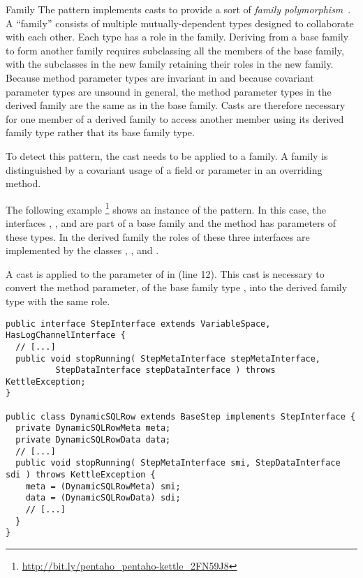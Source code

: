 \begin{pattern}{Family}
  The \thisp{} pattern implements casts
  to provide a sort of
  \emph{family
polymorphism}~\citep{ernstFamilyPolymorphism2001}.
A ``family'' consists of
multiple mutually-dependent types designed to collaborate with each other.
Each type has a role in the family.
  Deriving from a base family to form another
  family requires subclassing all the members of the base family, with the
  subclasses in the new family retaining their roles in the new family.
  Because method parameter types are invariant in \java{} and because
  covariant parameter types are unsound in general, the
  method parameter types in the
  derived family are the same as in the base family.
  Casts are therefore necessary for one member of a derived family to access
  another member using its derived family type rather that its base family
  type.

To detect this pattern, the cast needs to be applied to a family.
A family is distinguished by a covariant usage of a field or parameter in an overriding method.

\instances{}
The following example%
\footnote{\url{http://bit.ly/pentaho_pentaho-kettle_2FN59J8}}
shows an instance of the \thisp{} pattern.
%
  In this case, the interfaces , ,
  and  are part of a base family and the
   method has parameters of these types.
  In the derived family the roles of these three interfaces are
  implemented by the classes
  ,
  , and
  .

A cast is applied to the parameter  of  in
 (line 12). This cast is necessary to convert the
method parameter, of the base
family type , into the derived family type with the
same role.

\begin{verbatim}
public interface StepInterface extends VariableSpace, HasLogChannelInterface {
  // [...]
  public void stopRunning( StepMetaInterface stepMetaInterface,
          StepDataInterface stepDataInterface ) throws KettleException;
}

public class DynamicSQLRow extends BaseStep implements StepInterface {
  private DynamicSQLRowMeta meta;
  private DynamicSQLRowData data;
  // [...]
  public void stopRunning( StepMetaInterface smi, StepDataInterface sdi ) throws KettleException {
    meta = (DynamicSQLRowMeta) smi;
    data = (DynamicSQLRowData) sdi;
    // [...]
  }
}
\end{verbatim}


\end{pattern}
